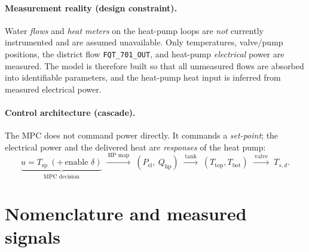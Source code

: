 \documentclass[11pt,a4paper]{article}
\newcommand{\Ttop}{T_{\mathrm{top}}}
\newcommand{\Tbot}{T_{\mathrm{bot}}}
\newcommand{\Tsp}{T_{\mathrm{sp}}} %
\newcommand{\Tsd}{T_{s,d}}         %
\newcommand{\Qhp}{Q_{\mathrm{hp}}}
\newcommand{\Pel}{P_{\mathrm{el}}}
\newcommand{\code}[1]{\texttt{#1}}
\begin{document}
\paragraph{Measurement reality (design constraint).}
Water \emph{flows} and \emph{heat meters} on the heat-pump loops are \emph{not}
currently instrumented and are assumed unavailable. Only temperatures, valve/pump
positions, the district flow \code{FQT\_701\_OUT}, and heat-pump \emph{electrical}
power are measured. The model is therefore built so that all unmeasured flows are
absorbed into identifiable parameters, and the heat-pump heat input is inferred
from measured electrical power.

\paragraph{Control architecture (cascade).}
The MPC does not command power directly. It commands a \emph{set-point}; the
electrical power and the delivered heat are \emph{responses} of the heat pump:
\begin{equation}
  \underbrace{u=\Tsp\ (+\,\text{enable }\delta)}_{\text{MPC decision}}
  \;\xrightarrow{\ \text{HP map}\ }\;
  (\Pel,\ \Qhp)
  \;\xrightarrow{\ \text{tank}\ }\;
  (\Ttop,\Tbot)
  \;\xrightarrow{\ \text{valve}\ }\;
  \Tsd .
\end{equation}

\section{Nomenclature and measured signals}
\end{document}
